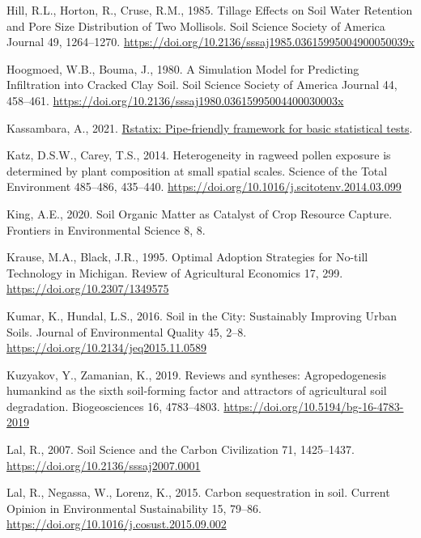 \documentclass[
  12pt,
]{article}
\newlength{\cslhangindent}
\newlength{\cslentryspacingunit} %
\newenvironment{CSLReferences}[2] %
 {%
  \setlength{\parindent}{0pt}
  \ifodd #1
  \let\oldpar\par
  \def\par{\hangindent=\cslhangindent\oldpar}
  \fi
  \setlength{\parskip}{#2\cslentryspacingunit}
 }%
 {}
\begin{document}
\begin{CSLReferences}{1}{0}
\leavevmode{}%
Hill, R.L., Horton, R., Cruse, R.M., 1985. Tillage {Effects} on {Soil Water Retention} and {Pore Size Distribution} of {Two Mollisols}. Soil Science Society of America Journal 49, 1264--1270. \url{https://doi.org/10.2136/sssaj1985.03615995004900050039x}

\leavevmode{}%
Hoogmoed, W.B., Bouma, J., 1980. A {Simulation Model} for {Predicting Infiltration} into {Cracked Clay Soil}. Soil Science Society of America Journal 44, 458--461. \url{https://doi.org/10.2136/sssaj1980.03615995004400030003x}

\leavevmode{}%
Kassambara, A., 2021. \href{https://CRAN.R-project.org/package=rstatix}{Rstatix: Pipe-friendly framework for basic statistical tests}.

\leavevmode{}%
Katz, D.S.W., Carey, T.S., 2014. Heterogeneity in ragweed pollen exposure is determined by plant composition at small spatial scales. Science of the Total Environment 485--486, 435--440. \url{https://doi.org/10.1016/j.scitotenv.2014.03.099}

\leavevmode{}%
King, A.E., 2020. Soil {Organic Matter} as {Catalyst} of {Crop Resource Capture}. Frontiers in Environmental Science 8, 8.

\leavevmode{}%
Krause, M.A., Black, J.R., 1995. Optimal {Adoption Strategies} for {No-till Technology} in {Michigan}. Review of Agricultural Economics 17, 299. \url{https://doi.org/10.2307/1349575}

\leavevmode{}%
Kumar, K., Hundal, L.S., 2016. Soil in the {City}: {Sustainably Improving Urban Soils}. Journal of Environmental Quality 45, 2--8. \url{https://doi.org/10.2134/jeq2015.11.0589}

\leavevmode{}%
Kuzyakov, Y., Zamanian, K., 2019. Reviews and syntheses: {Agropedogenesis} \textendash{} humankind as the sixth soil-forming factor and attractors of agricultural soil degradation. Biogeosciences 16, 4783--4803. \url{https://doi.org/10.5194/bg-16-4783-2019}

\leavevmode{}%
Lal, R., 2007. Soil {Science} and the {Carbon Civilization} 71, 1425--1437. \url{https://doi.org/10.2136/sssaj2007.0001}

\leavevmode{}%
Lal, R., Negassa, W., Lorenz, K., 2015. Carbon sequestration in soil. Current Opinion in Environmental Sustainability 15, 79--86. \url{https://doi.org/10.1016/j.cosust.2015.09.002}


\end{CSLReferences}
\end{document}
